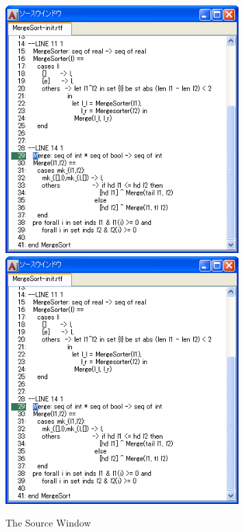 \documentclass[\pformat,12pt]{article}
\begin{document}
\begin{figure}[tbh]
\begin{center}
\includegraphics[width=9cm]{sourceWindow-pp.png}
\includegraphics[width=9cm]{sourceWindow-pp.png}
\caption{The Source Window}
\label{fig:source2}
\end{center}
\end{figure}
\end{document}
